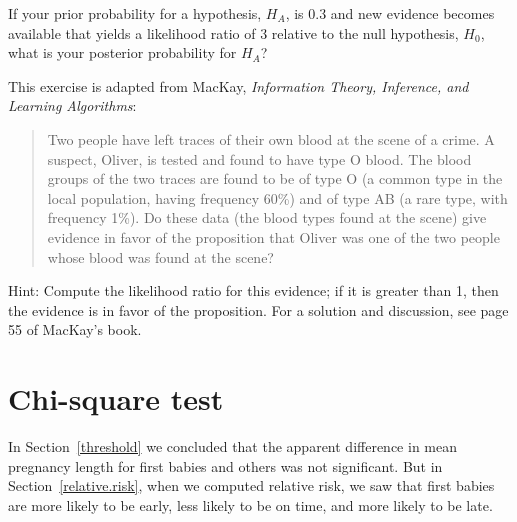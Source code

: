 \documentclass[12pt]{book}
\begin{document}
\begin{ex}


If your prior probability for a hypothesis, $H_A$, is 0.3 and new
evidence becomes available that yields a likelihood ratio of 3
relative to the null hypothesis, $H_0$, what is your posterior
probability for $H_A$?


\end{ex}


\begin{ex}


This exercise is adapted from MacKay, {\em Information
  Theory, Inference, and Learning Algorithms}:

\begin{quote}

Two people have left traces of their own blood at the scene of a
crime.  A suspect, Oliver, is tested and found to have type O blood.
The blood groups of the two traces are found to be of type O (a common
type in the local population, having frequency 60\%) and of type AB (a
rare type, with frequency 1\%).  Do these data (the blood types found
at the scene) give evidence in favor of the proposition that
Oliver was one of the two people whose blood was found at the scene?

\end{quote}

Hint: Compute the likelihood ratio for this evidence; if it is greater
than 1, then the evidence is in favor of the proposition.
For a solution and discussion, see page 55 of MacKay's book.


\end{ex}


\section{Chi-square test}

In Section~\ref{threshold} we concluded that the apparent difference
in mean pregnancy length for first babies and others was not
significant.  But in Section~\ref{relative.risk}, when we computed
relative risk, we saw that first babies are more likely to be early,
less likely to be on time, and more likely to be late.

\end{document}
